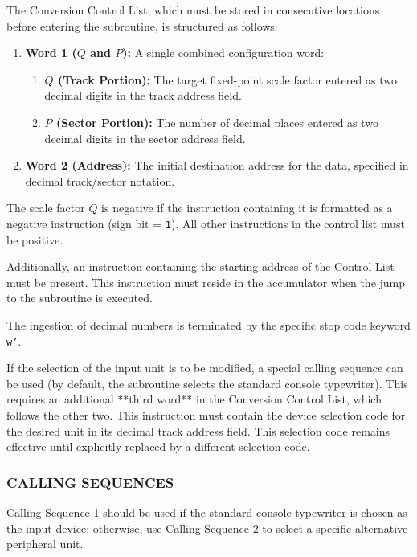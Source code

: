 The Conversion Control List, which must be stored in consecutive locations before entering the subroutine, is structured as follows:
\begin{enumerate}
    \item \textbf{Word 1 ($Q$ and $P$):} A single combined configuration word:
    \begin{enumerate}
        \item \textbf{$Q$ (Track Portion):} The target fixed-point scale factor entered as two decimal digits in the track address field.
        \item \textbf{$P$ (Sector Portion):} The number of decimal places entered as two decimal digits in the sector address field.
    \end{enumerate}
    \item \textbf{Word 2 (Address):} The initial destination address for the data, specified in decimal track/sector notation.
\end{enumerate}

The scale factor $Q$ is negative if the instruction containing it is formatted as a negative instruction (sign bit = \texttt{1}). All other instructions in the control list must be positive.

Additionally, an instruction containing the starting address of the Control List must be present. This instruction must reside in the accumulator when the jump to the subroutine is executed.

The ingestion of decimal numbers is terminated by the specific stop code keyword \texttt{w'}.

If the selection of the input unit is to be modified, a special calling sequence can be used (by default, the subroutine selects the standard console typewriter). This requires an additional **third word** in the Conversion Control List, which follows the other two. This instruction must contain the device selection code for the desired unit in its decimal track address field. This selection code remains effective until explicitly replaced by a different selection code.

\subsubsection*{CALLING SEQUENCES}
Calling Sequence 1 should be used if the standard console typewriter is chosen as the input device; otherwise, use Calling Sequence 2 to select a specific alternative peripheral unit.

